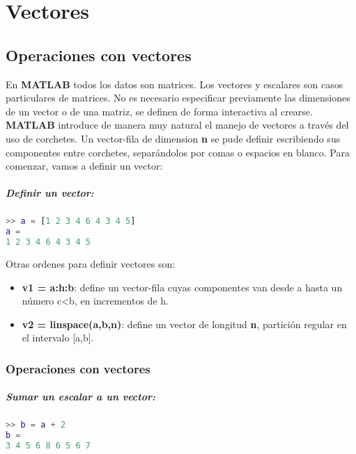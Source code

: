 \chapter{Vectores}

\section{Operaciones con vectores}

En \textbf{MATLAB} todos los datos son matrices. Los vectores y escalares son casos particulares de matrices. No es necesario especificar previamente las dimensiones de un vector o de una matriz, se definen de forma interactiva al crearse. \textbf{MATLAB} introduce de manera muy natural el manejo de vectores a través del uso de corchetes. Un vector-fila de dimension \textbf{n} se pude definir  escribiendo sus componentes entre corchetes, separándolos por comas o espacios en blanco. Para comenzar, vamos a definir un vector:

\paragraph{Definir un vector:}
\begin{lstlisting}[language=Matlab]
>> a = [1 2 3 4 6 4 3 4 5]
a =
1 2 3 4 6 4 3 4 5
\end{lstlisting}

Otras ordenes para definir vectores son:

\begin{itemize}
\item \textbf{v1 = a:h:b}: define un vector-fila cuyas componentes van desde a hasta un número c<b, en incrementos de h.
\item \textbf{v2 = linspace(a,b,n)}: define un vector de longitud \textbf{n}, partición regular en el intervalo [a,b].
\end{itemize}

\subsection{Operaciones con vectores}

\paragraph{Sumar un escalar a un vector:}
\begin{lstlisting}[language=Matlab]
>> b = a + 2
b =
3 4 5 6 8 6 5 6 7
\end{lstlisting}

